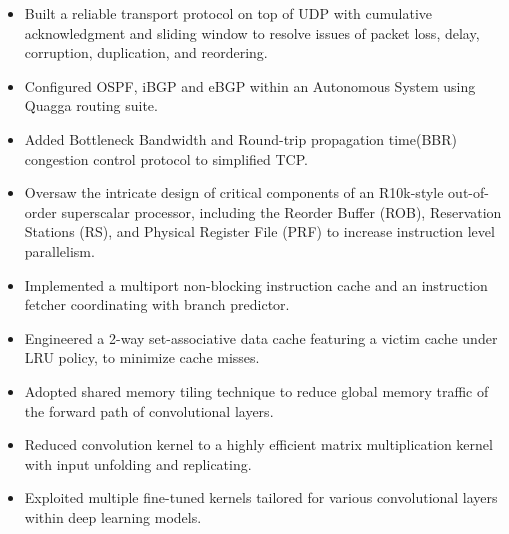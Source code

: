 \documentclass[10pt,a4paper]{altacv}
\begin{document}

\begin{itemize}
	\item Built a reliable transport protocol on top of UDP with cumulative acknowledgment and sliding window to resolve issues of packet loss, delay, corruption, duplication, and reordering.
	\item Configured OSPF, iBGP and eBGP within an Autonomous System using Quagga routing suite.
	\item Added Bottleneck Bandwidth and Round-trip propagation time(BBR) congestion control protocol to simplified TCP.
\end{itemize}

\begin{itemize}
	\item Oversaw the intricate design of critical components of an R10k-style out-of-order superscalar processor, including the Reorder Buffer (ROB), Reservation Stations (RS), and Physical Register File (PRF) to increase instruction level parallelism.
	\item Implemented a multiport non-blocking instruction cache and an instruction fetcher coordinating with branch predictor.
	\item Engineered a 2-way set-associative data cache featuring a victim cache under LRU policy, to minimize cache misses.
\end{itemize}


\begin{itemize}
	\item Adopted shared memory tiling technique to reduce global memory traffic of the forward path of convolutional layers.
	\item Reduced convolution kernel to a highly efficient matrix multiplication kernel with input unfolding and replicating.
	\item Exploited multiple fine-tuned kernels tailored for various convolutional layers within deep learning models.
\end{itemize}
\end{document}
